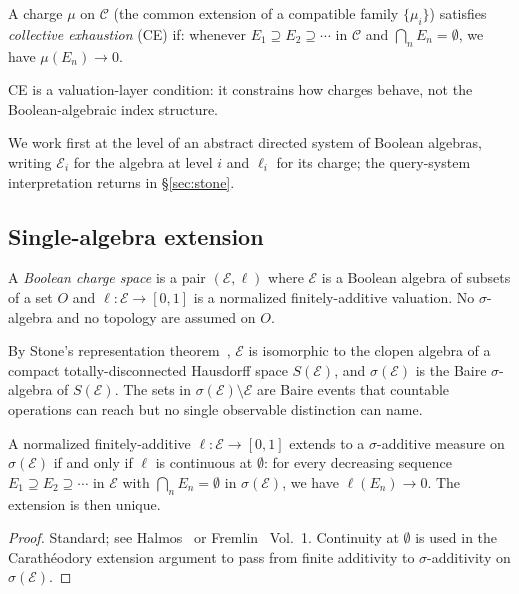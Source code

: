 \begin{definition}
\label{def:ce}
A charge $\mu$ on $\mathcal{C}$ (the common extension of a compatible family $\{\mu_i\}$) satisfies \emph{collective exhaustion} (CE) if: whenever $E_1 \supseteq E_2 \supseteq \cdots$ in $\mathcal{C}$ and $\bigcap_n E_n = \emptyset$, we have $\mu(E_n) \to 0$.
\end{definition}

\noindent CE is a valuation-layer condition: it constrains how charges behave, not the Boolean-algebraic index structure.

We work first at the level of an abstract directed system of Boolean algebras, writing $\mathcal{E}_i$ for the algebra at level $i$ and $\ell_i$ for its charge; the query-system interpretation returns in \S\ref{sec:stone}.

\subsection{Single-algebra extension}

\begin{definition}
A \emph{Boolean charge space} is a pair $(\mathcal{E}, \ell)$ where $\mathcal{E}$ is a Boolean algebra of subsets of a set $O$ and $\ell : \mathcal{E} \to [0,1]$ is a normalized finitely-additive valuation. No $\sigma$-algebra and no topology are assumed on $O$.
\end{definition}

By Stone's representation theorem~\cite{Stone1936}, $\mathcal{E}$ is isomorphic to the clopen algebra of a compact totally-disconnected Hausdorff space $S(\mathcal{E})$, and $\sigma(\mathcal{E})$ is the Baire $\sigma$-algebra of $S(\mathcal{E})$.  The sets in $\sigma(\mathcal{E}) \setminus \mathcal{E}$ are Baire events that countable operations can reach but no single observable distinction can name.

\begin{lemma}
\label{thm:extension-criterion}
A normalized finitely-additive $\ell : \mathcal{E} \to [0,1]$ extends to a $\sigma$-additive measure on $\sigma(\mathcal{E})$ if and only if $\ell$ is continuous at $\emptyset$: for every decreasing sequence $E_1 \supseteq E_2 \supseteq \cdots$ in $\mathcal{E}$ with $\bigcap_n E_n = \emptyset$ in $\sigma(\mathcal{E})$, we have $\ell(E_n) \to 0$.  The extension is then unique.
\end{lemma}

\begin{proof}
Standard; see Halmos~\cite{Halmos1950} or Fremlin~\cite{Fremlin2003} Vol.~1.  Continuity at $\emptyset$ is used in the Carathéodory extension argument to pass from finite additivity to $\sigma$-additivity on $\sigma(\mathcal{E})$.
\end{proof}

